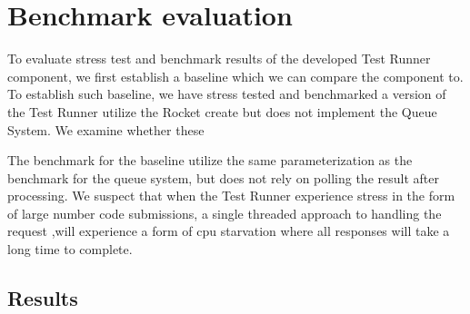 \section{Benchmark evaluation}
To evaluate stress test and benchmark results of the developed Test Runner component, we first establish a baseline which we can compare the component to. 
To establish such baseline, we have stress tested and benchmarked a version of the Test Runner utilize the Rocket create but does not implement the Queue System. 
We examine whether these 


The benchmark for the baseline utilize the same parameterization as the benchmark for the queue system, but does not rely on polling the result after processing. 
We suspect that when the Test Runner experience stress in the form of large number code submissions, a single threaded approach to handling the request ,will experience a form of cpu starvation where all responses will take a long time to complete.


\subsection{Results}


